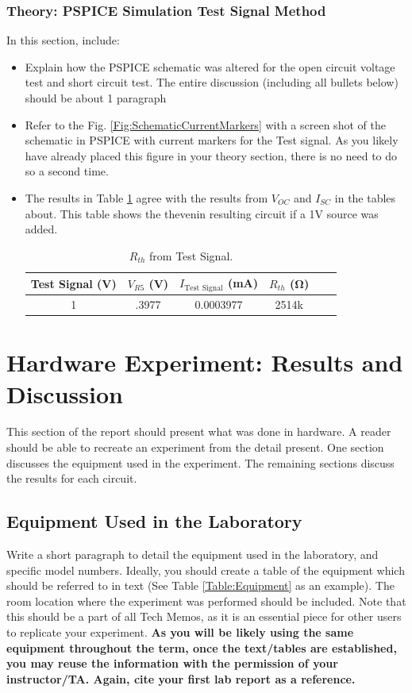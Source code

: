 \documentclass[11pt]{article}
\begin{document}
\subsubsection{Theory: PSPICE Simulation Test Signal Method }
 In this section, include: 
 \begin{itemize}
 	\item Explain how the PSPICE schematic was altered for the open circuit voltage test and short circuit test. The entire discussion (including all bullets below) should be about 1 paragraph
 	\item Refer to the Fig. \ref{Fig:SchematicCurrentMarkers} with a screen shot of the schematic in PSPICE with current markers for the Test signal.  As you likely have already placed this figure in your theory section, there is no need to do so a second time.  
 	
 
 	\item The results in Table \ref{Table:Lab3ReqTestSignalPSPICE} agree with the results from $V_{OC}$ and $I_{SC}$ in the tables about. This table shows the thevenin resulting circuit if a 1V source was added. 
 		\begin{table}[h!]
 			\centering
 			\caption{$R_{th}$ from Test Signal.}
 			\label{Table:Lab3ReqTestSignalPSPICE}
 			\begin{tabular}{|c|c|c|c|c|c|}
 				\hline
 				Test Signal  (\si{\volt}) &$V_{R5}$ (\si{\volt}) & $I_{\mbox{Test Signal}}$ (\si{\milli\ampere}) & $R_{th}$ (\si{\ohm})\\
 				\hline
 				1 & .3977 & 0.0003977 & 2514k \\	 \hline 
 			\end{tabular}
 		\end{table}
 \end{itemize}

\section{Hardware Experiment: Results and Discussion}
This section of the report should present what was done in hardware.  A reader should be able to recreate an experiment from the detail present.  One section discusses the equipment used in the experiment. The remaining sections discuss the results for each circuit.
\subsection{Equipment Used in the Laboratory}
Write a short paragraph to detail the equipment used in the laboratory, and specific model numbers. Ideally, you should create a table of the equipment which should be referred to in text (See Table \ref{Table:Equipment} as an example).  The room location where the experiment was performed should be included.  Note that this should be a part of all Tech Memos, as it is an essential piece for other users to replicate your experiment.  \textbf{As you will be likely using the same equipment throughout the term, once the text/tables are established, you may reuse the information with the permission of your instructor/TA. Again, cite your first lab report as a reference.}
		
\end{document}
